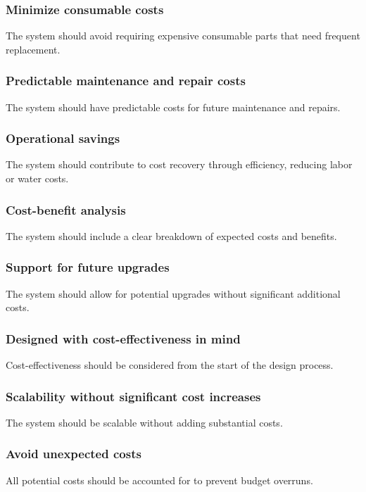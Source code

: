 \documentclass[11pt]{article}
\begin{document}
\subsubsection{Minimize consumable costs}
The system should avoid requiring expensive consumable parts that need frequent replacement.

\subsubsection{Predictable maintenance and repair costs}
The system should have predictable costs for future maintenance and repairs.

\subsubsection{Operational savings}
The system should contribute to cost recovery through efficiency, reducing labor or water costs.

\subsubsection{Cost-benefit analysis}
The system should include a clear breakdown of expected costs and benefits.

\subsubsection{Support for future upgrades}
The system should allow for potential upgrades without significant additional costs.

\subsubsection{Designed with cost-effectiveness in mind}
Cost-effectiveness should be considered from the start of the design process.

\subsubsection{Scalability without significant cost increases}
The system should be scalable without adding substantial costs.

\subsubsection{Avoid unexpected costs}
All potential costs should be accounted for to prevent budget overruns.
\end{document}
